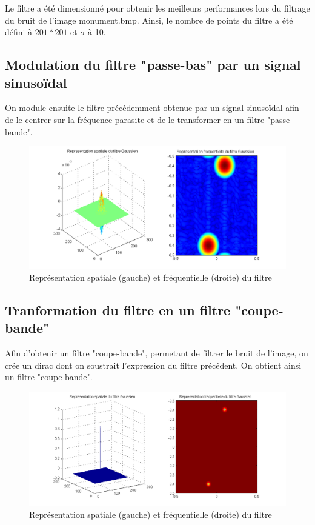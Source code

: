 \documentclass[11pt]{article}
\begin{document}
	Le filtre a été dimensionné pour obtenir les meilleurs performances lors du filtrage du bruit de l'image monument.bmp. Ainsi, le nombre de points du filtre a été défini à $201*201$ et $\sigma$ à 10.
	
	\subsection{Modulation du filtre "passe-bas" par un signal sinusoïdal}
	
	On module ensuite le filtre précédemment obtenue par un signal sinusoïdal afin de le centrer sur la fréquence parasite et de le transformer en un filtre "passe-bande".
	
		\begin{figure}[H]
			\centering
			\includegraphics[scale=0.65]{img/img4.png}
			\caption{Représentation spatiale (gauche) et fréquentielle (droite) du filtre}
			\label{img4}
		\end{figure}

\subsection{Tranformation du filtre en un filtre "coupe-bande"}

	Afin d'obtenir un filtre "coupe-bande", permetant de filtrer le bruit de l'image, on crée un dirac dont on soustrait l'expression du filtre précédent. On obtient ainsi un filtre "coupe-bande".

		\begin{figure}[h]
			\centering
			\includegraphics[scale=0.65]{img/img5.png}
			\caption{Représentation spatiale (gauche) et fréquentielle (droite) du filtre}
			\label{img5}
		\end{figure}	
\end{document}
